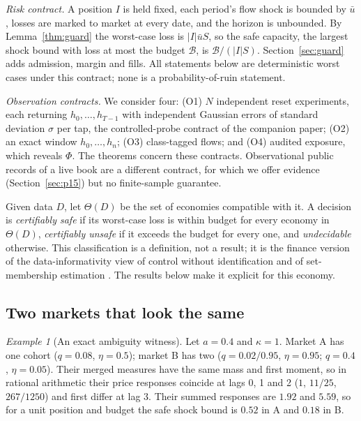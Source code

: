 \documentclass[12pt]{article}
\theoremstyle{definition}
\theoremstyle{remark}
\newtheorem{example}[theorem]{Example}
\begin{document}
\emph{Risk contract.} A position $I$ is held fixed, each period's flow shock is bounded by $\bar u$, losses are marked to market at every date, and the horizon is unbounded. By Lemma~\ref{thm:guard} the worst-case loss is $|I|\bar uS$, so the safe capacity, the largest shock bound with loss at most the budget $\mathcal B$, is $\mathcal B/(|I|S)$. Section~\ref{sec:guard} adds admission, margin and fills. All statements below are deterministic worst cases under this contract; none is a probability-of-ruin statement.

\emph{Observation contracts.} We consider four: (O1) $N$ independent reset experiments, each returning $h_0,\ldots,h_{T-1}$ with independent Gaussian errors of standard deviation $\sigma$ per tap, the controlled-probe contract of the companion paper; (O2) an exact window $h_0,\ldots,h_n$; (O3) class-tagged flows; and (O4) audited exposure, which reveals $\Phi$. The theorems concern these contracts. Observational public records of a live book are a different contract, for which we offer evidence (Section~\ref{sec:p15}) but no finite-sample guarantee.

Given data $D$, let $\Theta(D)$ be the set of economies compatible with it. A decision is \emph{certifiably safe} if its worst-case loss is within budget for every economy in $\Theta(D)$, \emph{certifiably unsafe} if it exceeds the budget for every one, and \emph{undecidable} otherwise. This classification is a definition, not a result; it is the finance version of the data-informativity view of control without identification \citep{vanwaarde2020} and of set-membership estimation \citep{milanese1991}. The results below make it explicit for this economy.

\subsection{Two markets that look the same}

\begin{example}[An exact ambiguity witness]\label{ex:witness}
Let $a=0.4$ and $\kappa=1$. Market A has one cohort ($q=0.08$, $\eta=0.5$); market B has two ($q=0.02/0.95$, $\eta=0.95$; $q=0.4$, $\eta=0.05$). Their merged measures have the same mass and first moment, so in rational arithmetic their price responses coincide at lags 0, 1 and 2 ($1$, $11/25$, $267/1250$) and first differ at lag 3. Their summed responses are $1.92$ and $5.59$, so for a unit position and budget the safe shock bound is $0.52$ in A and $0.18$ in B.
\end{example}
\end{document}
